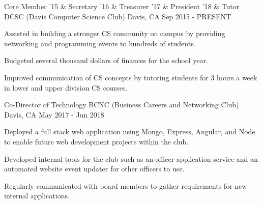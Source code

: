 

\begin{cventries}

  \cventry
  {Core Member '15 \& Secretary '16 \& Treasurer '17 \& President '18 \& Tutor} %
  {DCSC (Davis Computer Science Club)} %
  {Davis, CA} %
  {Sep 2015 - PRESENT} %
  {
    \begin{cvitems} %
      \item {Assisted in building a stronger CS community on campus by providing networking and programming events to hundreds of students.}
      \item {Budgeted several thousand dollars of finances for the school year.}
      \item {Improved communication of CS concepts by tutoring students for 3 hours a week in lower and upper division CS courses.}
    \end{cvitems}
  }

  \cventry
  {Co-Director of Technology} %
  {BCNC (Business Careers and Networking Club)} %
  {Davis, CA} %
  {May 2017 - Jun 2018} %
  {
    \begin{cvitems} %
      \item {Deployed a full stack web application using Mongo, Express, Angular, and Node to enable future web development projects within the club.}
      \item {Developed internal tools for the club such as an officer application service and an automated website event updater for other officers to use.}
      \item {Regularly communicated with board members to gather requirements for new internal applications.}
    \end{cvitems}
  }
\end{cventries}
